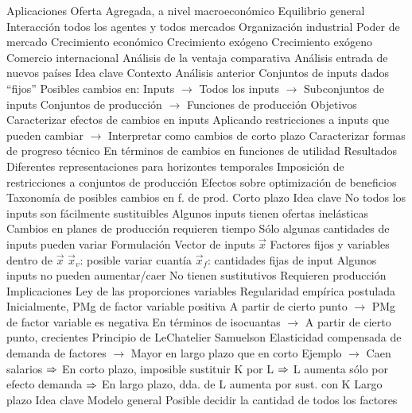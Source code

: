 \documentclass{nuevotema}
\begin{document}
\begin{esquemal}
		\2 Aplicaciones
			\3 Oferta
				\4 Agregada, a nivel macroeconómico
			\3 Equilibrio general
				\4 Interacción todos los agentes y todos mercados
			\3 Organización industrial
				\4 Poder de mercado
			\3 Crecimiento económico
				\4 Crecimiento exógeno
				\4 Crecimiento exógeno
			\3 Comercio internacional
				\4 Análisis de la ventaja comparativa
				\4 Análisis entrada de nuevos países
	\1 
		\2 Idea clave
			\3 Contexto
				\4 Análisis anterior
				\4[] Conjuntos de inputs dados ``fijos''
				\4 Posibles cambios en:
				\4[] Inputs
				\4[] $\to$ Todos los inputs
				\4[] $\to$ Subconjuntos de inputs
				\4[] Conjuntos de producción
				\4[] $\to$ Funciones de producción
			\3 Objetivos
				\4 Caracterizar efectos de cambios en inputs
				\4[] Aplicando restricciones a inputs que pueden cambiar
				\4[] $\to$ Interpretar como cambios de corto plazo
				\4 Caracterizar formas de progreso técnico
				\4[] En términos de cambios en funciones de utilidad
			\3 Resultados
				\4 Diferentes representaciones para horizontes temporales
				\4 Imposición de restricciones a conjuntos de producción
				\4 Efectos sobre optimización de beneficios
				\4 Taxonomía de posibles cambios en f. de prod.
		\2 Corto plazo
			\3 Idea clave
				\4 No todos los inputs son fácilmente sustituibles
				\4 Algunos inputs tienen ofertas inelásticas
				\4 Cambios en planes de producción requieren tiempo
				\4[$\then$] Sólo algunas cantidades de inputs pueden variar
			\3 Formulación
				\4 Vector de inputs $\vec{x}$
				\4 Factores fijos y variables dentro de $\vec{x}$
				\4[] $\vec{x}_v$: posible variar cuantía
				\4[] $\vec{x}_f$: cantidades fijas de input
				\4 Algunos inputs no pueden aumentar/caer
				\4[] No tienen sustitutivos
				\4[] Requieren producción
			\3 Implicaciones
				\4 Ley de las proporciones variables
				\4[] Regularidad empírica postulada
				\4[] Inicialmente, PMg de factor variable positiva
				\4[] A partir de cierto punto
				\4[] $\to$ PMg de factor variable es negativa
				\4[] En términos de isocuantas
				\4[] $\to$ A partir de cierto punto, crecientes
				\4 Principio de LeChatelier Samuelson
				\4[] Elasticidad compensada de demanda de factores
				\4[] $\to$ Mayor en largo plazo que en corto
				\4[] Ejemplo
				\4[] $\to$ Caen salarios
				\4[] $\then$ En corto plazo, imposible sustituir K por L
				\4[] $\then$ L aumenta sólo por efecto demanda
				\4[] $\then$ En largo plazo, dda. de L aumenta por sust. con K
		\2 Largo plazo
			\3 Idea clave
				\4 Modelo general
				\4 Posible decidir la cantidad de todos los factores

\end{esquemal}
\end{document}
